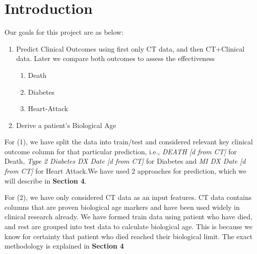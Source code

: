 \section{Introduction}

Our goals for this project are as below:
\begin{enumerate}
    \item Predict Clinical Outcomes using first only CT data, and then CT+Clinical data. Later we compare both outcomes to assess the effectiveness
    \begin{enumerate}
        \item Death
        \item Diabetes
        \item Heart-Attack
    \end{enumerate}
    \item Derive a patient's Biological Age
\end{enumerate}

For (1), we have split the data into train/test and considered relevant key clinical outcome column for that particular prediction, i.e., \textit{DEATH [d from CT]} for Death, \textit{Type 2 Diabetes DX Date [d from CT]} for Diabetes and \textit{MI DX Date [d from CT]} for Heart Attack.We have used 2 approaches for prediction, which we will describe in \textbf{Section 4}.

For (2), we have only considered CT data as an input features. CT data contains columns that are proven biological age markers and have been used widely in clinical research \cite{common_methods_of_biological_age_estimation} \cite{60_new_50} \cite{bio_using_PCA} already. We have formed train data using patient who have died, and rest are grouped into test data to calculate biological age. This is because we know for certainty that patient who died reached their biological limit. The exact methodology is explained in \textbf{Section 4}  

